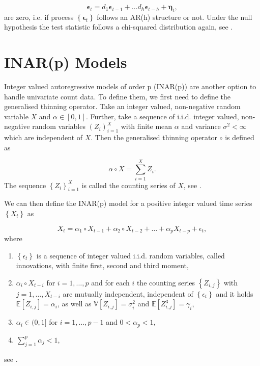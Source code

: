 \begin{equation}
\bm{\epsilon}_t = d_1\bm{\epsilon}_{t-1} +\ldots d_h \bm{\epsilon}_{t-h} + \bm{\eta}_t,
\label{eq:Breusch-Godfrey Test model}
\end{equation}
%
are zero, i.e. if process $\left\{\bm{\epsilon}_t\right\}$ follows an AR(h) structure or not. Under the null hypothesis the test statistic follows a chi-squared distribution again, see \textcite{Lütkepohl:2007}. 

\section{INAR(p) Models}
\label{sec: Inar Models}

Integer valued autoregressive models of order p (INAR(p)) are another option to handle univariate count data. To define them, we first need to define the generalised thinning operator. Take an integer valued, non-negative random variable $X$ and $\alpha \in [0,1]$. Further, take a sequence of i.i.d. integer valued, non-negative random variables $(Z_i)_{i=1}^X$ with finite mean $\alpha$ and variance $\sigma^2<\infty $ which are independent of $X$. Then the generalised thinning operator $\circ$ is defined as

\begin{equation}
\alpha \circ X = \sum_{i=1}^X Z_i .
\label{eq:Thinning operator}
\end{equation}
%
The sequence  $\left\{Z_i \right\}_{i=1}^X$ is called the counting series of $X$, see \textcite{Silva:2005}. 

We can then define the INAR(p) model for a positive integer valued time series $\left\{X_t \right\}$ as

\begin{equation}
X_t = \alpha_1 \circ X_{t-1} + \alpha_2 \circ X_{t-2} + \ldots + \alpha_p X_{t-p} +\epsilon_t ,
\label{eq:Inar(p) model}
\end{equation}
%
where

\begin{enumerate}
	\item $\left\{\epsilon_t\right\}$ is a sequence of integer valued i.i.d. random variables, called innovations, with finite first, second and third moment, 
	\item $\alpha_i \circ X_{t-i}$ for $i= 1,\ldots,p$ and for each $i$ the counting series $\left\{Z_{i,j}\right\}$ with $j=1,\ldots,X_{t-i}$ are mutually independent, independent of $\left\{\epsilon_t\right\}$ and it holds $\mathbb{E}[Z_{i,j}]=\alpha_i$, as well as $\mathbb{V}[Z_{i,j}] = \sigma_i^2$ and $\mathbb{E}[Z_{i,j}^3] = \gamma_i$,
	\item $\alpha_i \in (0,1]$ for $i=1,\ldots,p-1$ and $0 < \alpha_p < 1$,
	\item $\sum_{j=1}^p \alpha_j < 1$,
\end{enumerate}
%
see \textcite{Silva:2005}. 

